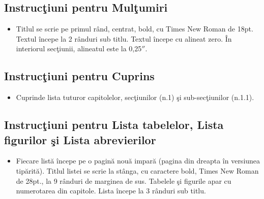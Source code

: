  \thispagestyle{empty}  
\subsection*{Instruc\c{t}iuni pentru Mul\c{t}umiri}
\begin{itemize}
  \item Titlul se scrie pe primul r\^{a}nd, centrat, bold, cu Times New Roman de 18pt. Textul \^{i}ncepe la 2 r\^{a}nduri sub titlu. Textul \^{i}ncepe cu alineat zero. \^{I}n interiorul sec\c{t}iunii, alineatul este la 0,25$''$.
  \end{itemize}
  
\subsection*{Instruc\c{t}iuni pentru Cuprins}
\begin{itemize}
  \item Cuprinde lista tuturor capitolelor, sec\c{t}iunilor (n.1) \c{s}i sub-sec\c{t}iunilor (n.1.1).
\end{itemize}  

\subsection*{Instruc\c{t}iuni pentru Lista tabelelor, Lista figurilor \c{s}i Lista abrevierilor}
\begin{itemize}
  \item Fiecare list\u{a} \^{i}ncepe pe o pagin\u{a} nou\u{a} impar\u{a} (pagina din dreapta în versiunea tip\u{a}rit\u{a}). Titlul listei se scrie la st\^{a}nga, cu caractere bold, Times New Roman de 28pt., la 9 r\^{a}nduri de marginea de sus. Tabelele \c{s}i figurile apar cu numerotarea din capitole. Lista \^{i}ncepe la 3 r\^{a}nduri sub titlu.
\end{itemize} 



